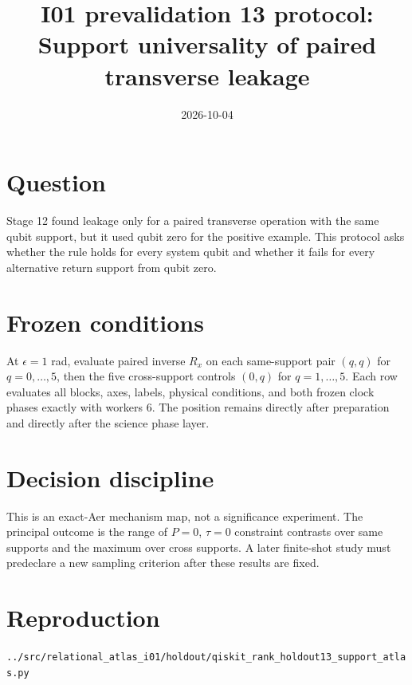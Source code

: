 \documentclass[11pt]{article}
\begin{document}
\title{I01 prevalidation 13 protocol:\\Support universality of paired transverse leakage}
\date{2026-10-04}
\maketitle

\section*{Question}
Stage 12 found leakage only for a paired transverse operation with the same qubit
support, but it used qubit zero for the positive example. This protocol asks whether
the rule holds for every system qubit and whether it fails for every alternative
return support from qubit zero.

\section*{Frozen conditions}
At $\epsilon=1$ rad, evaluate paired inverse $R_x$ on each same-support pair
$(q,q)$ for $q=0,\ldots,5$, then the five cross-support controls $(0,q)$ for
$q=1,\ldots,5$. Each row evaluates all blocks, axes, labels, physical conditions,
and both frozen clock phases exactly with workers 6. The position remains directly
after preparation and directly after the science phase layer.

\section*{Decision discipline}
This is an exact-Aer mechanism map, not a significance experiment. The principal
outcome is the range of $P=0$, $\tau=0$ constraint contrasts over same supports and
the maximum over cross supports. A later finite-shot study must predeclare a new
sampling criterion after these results are fixed.

\section*{Reproduction}
\texttt{../src/relational\_atlas\_i01/holdout/qiskit\_rank\_holdout13\_support\_atlas.py}
\end{document}
